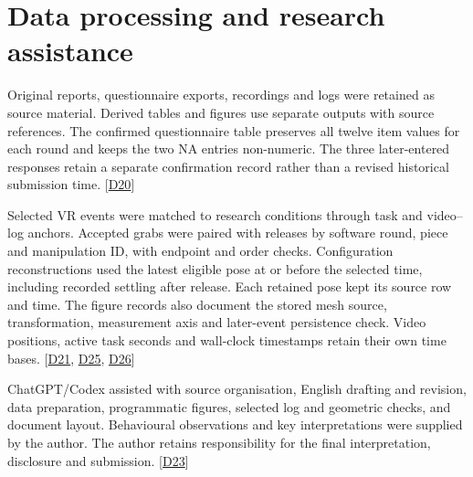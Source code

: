 \chapter{Data processing and research assistance}\label{chap:D}

Original reports, questionnaire exports, recordings and logs were retained as source material. Derived tables and figures use separate outputs with source references. The confirmed questionnaire table preserves all twelve item values for each round and keeps the two NA entries non-numeric. The three later-entered responses retain a separate confirmation record rather than a revised historical submission time. [\hyperlink{src:D20}{D20}]

Selected VR events were matched to research conditions through task and video--log anchors. Accepted grabs were paired with releases by software round, piece and manipulation ID, with endpoint and order checks. Configuration reconstructions used the latest eligible pose at or before the selected time, including recorded settling after release. Each retained pose kept its source row and time. The figure records also document the stored mesh source, transformation, measurement axis and later-event persistence check. Video positions, active task seconds and wall-clock timestamps retain their own time bases. [\hyperlink{src:D21}{D21}, \hyperlink{src:D25}{D25}, \hyperlink{src:D26}{D26}]

ChatGPT/Codex assisted with source organisation, English drafting and revision, data preparation, programmatic figures, selected log and geometric checks, and document layout. Behavioural observations and key interpretations were supplied by the author. The author retains responsibility for the final interpretation, disclosure and submission. [\hyperlink{src:D23}{D23}]

